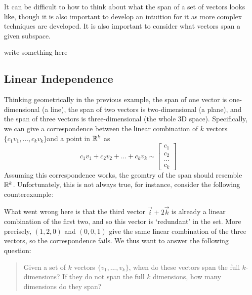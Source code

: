 It can be difficult to how to think about what the span of a set of vectors looks like, though it is also important to develop
an intuition for it as more complex techniques are developed. It is also important to consider what vectors span a given subspace.

\todo write something here\\
\subsection{Linear Independence}
Thinking geometrically in the previous example, the span of one vector is one-dimensional (a line), the span of two vectors is two-dimensional (a plane),
and the span of three vectors is three-dimensional (the whole 3D space). Specifically,
we can give a correspondence between the linear combination of $k$ vectors $\{c_1{v}_1,...,c_k{v}_k\}$and a point in $\mathbb{R}^k$ as \[
	c_1{v}_1+c_2{v}_2+...+c_k{v}_k \sim \begin{bmatrix}
		c_1 \\ c_2\\ ...\\ c_k
	\end{bmatrix}
\]
Assuming this correspondence works, the geomtry of the span should resemble $\mathbb{R}^k$.
Unfortunately, this is not always true, for instance, consider the following counterexample:
\todo

What went wrong here is that the third vector $\vec{i}+2\vec{k}$ is already a linear combination of the first two, and so this vector is `redundant' in the set.
More precisely, $(1,2,0)$ and $(0,0,1)$ give the same linear combination of the three vectors, so the correspondence fails. We thus want to answer the following question:
\begin{quotation}
	Given a set of $k$ vectors $\{{v}_1,...,{v}_k\}$, when do these vectors span the full $k$-dimensions?
	If they do not span the full $k$ dimensions, how many dimensions do they span?  
\end{quotation}

